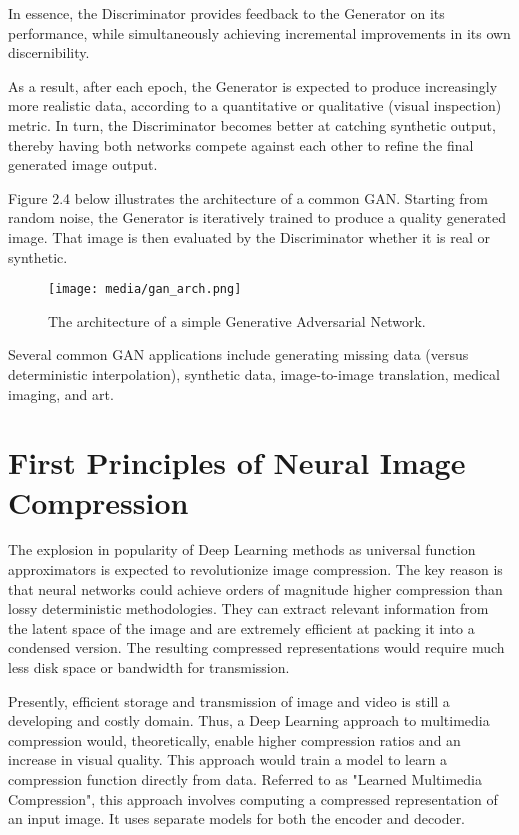 In essence, the Discriminator provides feedback to the Generator on its performance, while 
simultaneously achieving incremental improvements in its own discernibility. 

As a result, after each epoch, the Generator is expected to produce increasingly more realistic data,
according to a quantitative or qualitative (visual inspection) metric. In turn, the Discriminator becomes 
better at catching synthetic output, thereby having both networks compete against each other to 
refine the final generated image output.

\vspace{5mm}

Figure 2.4 below illustrates the architecture of a common GAN. Starting from random noise,
the Generator is iteratively trained to produce a quality generated image.
That image is then evaluated by the Discriminator whether it is real or synthetic.

\begin{figure}[H]
	\begin{center}
	\texttt{[image: media/gan\_arch.png]}
	\end{center}
	\caption[GAN Architecture]{The architecture of a simple
    Generative Adversarial Network. \citep{GANs}}
	\end{figure}

Several common GAN applications include generating missing data (versus deterministic
interpolation), synthetic data, image-to-image translation, medical imaging, and art.


\section{First Principles of Neural Image Compression}

The explosion in popularity of Deep Learning methods as universal function approximators
is expected to revolutionize image compression. The key reason is that neural networks
could achieve orders of magnitude higher compression than lossy deterministic methodologies.
They can extract relevant information from the latent space of the image and are extremely efficient 
at packing it into a condensed version. The resulting compressed representations would require much less 
disk space or bandwidth for transmission.

Presently, efficient storage and transmission of image and video is still a developing and costly domain.
Thus, a Deep Learning approach to multimedia compression would, theoretically, enable higher compression ratios 
and an increase in visual quality. This approach would train a model to learn a compression function directly from data. 
Referred to as "Learned Multimedia Compression", this approach involves
computing a compressed representation of an input image. It uses separate models for both the encoder and decoder.
\citep{Principles}


